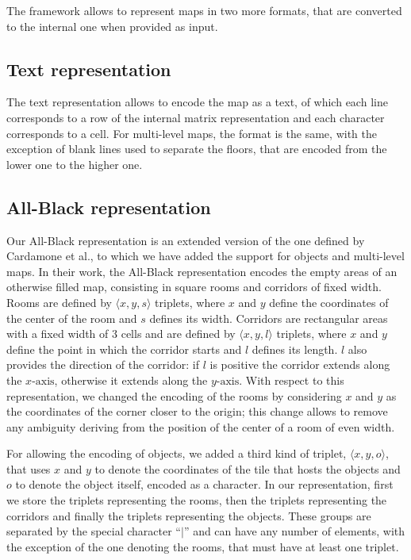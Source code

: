 \par

The framework allows to represent maps in two more formats, that are converted to the internal one when provided as input.


\subsection{Text representation}

The text representation allows to encode the map as a text, of which each line corresponds to a row of the internal matrix representation and each character corresponds to a cell. For multi-level maps, the format is the same, with the exception of blank lines used to separate the floors, that are encoded from the lower one to the higher one.


\subsection{All-Black representation}

Our All-Black representation is an extended version of the one defined by Cardamone et al.\cite{Cardamone:2011:EIM:2008402.2008411}, to which we have added the support for objects and multi-level maps. In their work, the All-Black representation encodes the empty areas of an otherwise filled map, consisting in square rooms and corridors of fixed width. Rooms are defined by $\langle x,y,s \rangle$ triplets, where $x$ and $y$ define the coordinates of the center of the room and $s$ defines its width. Corridors are rectangular areas with a fixed width of $3$ cells and are defined by $\langle x,y,l \rangle$ triplets, where $x$ and $y$ define the point in which the corridor starts and $l$ defines its length. $l$ also provides the direction of the corridor: if $l$ is positive the corridor extends along the $x\text{-axis}$, otherwise it extends along the $y\text{-axis}$. With respect to this representation, we changed the encoding of the rooms by considering $x$ and $y$ as the coordinates of the corner closer to the origin; this change allows to remove any ambiguity deriving from the position of the center of a room of even width.

\par

For allowing the encoding of objects, we added a third kind of triplet, $\langle x,y,o \rangle$, that uses $x$ and $y$ to denote the coordinates of the tile that hosts the objects and $o$ to denote the object itself, encoded as a character. In our representation, first we store the triplets representing the rooms, then the triplets representing the corridors and finally the triplets representing the objects. These groups are separated by the special character ``$\mid$'' and can have any number of elements, with the exception of the one denoting the rooms, that must have at least one triplet.

